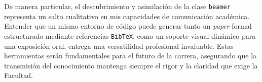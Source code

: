 De manera particular, el descubrimiento y asimilación de la clase \texttt{beamer} representa un salto cualitativo en mis capacidades de comunicación académica. Entender que un mismo entorno de código puede generar tanto un \textit{paper} formal estructurado mediante referencias \texttt{BibTeX}, como un soporte visual dinámico para una exposición oral, entrega una versatilidad profesional invaluable. Estas herramientas serán fundamentales para el futuro de la carrera, asegurando que la transmisión del conocimiento mantenga siempre el rigor y la claridad que exige la Facultad.
